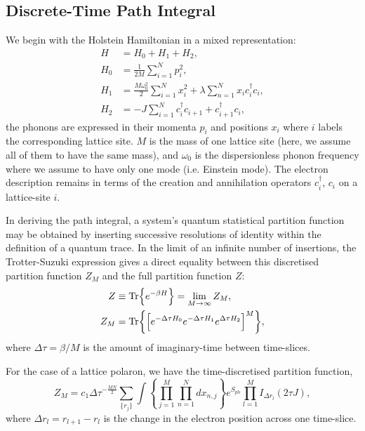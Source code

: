 \subsection{Discrete-Time Path Integral}
\label{subsec:3-2-1}

We begin with the Holstein Hamiltonian in a mixed representation:
\begin{equation}
    \begin{aligned}
        H &= H_{0} + H_{1} + H_{2} , \\
        H_{0} &= \frac{1}{2M} \sum_{i=1}^N p_i^2 , \\
        H_{1} &= \frac{M \omega_0^2}{2} \sum_{i=1}^N x_i^2 + \lambda \sum_{n=1}^N x_i c^\dagger_i c_i , \\
        H_{2} &= -J \sum_{i=1}^N c^\dagger_i c_{i+1} + c_{i+1}^\dagger c_i ,
    \end{aligned}
\end{equation}
the phonons are expressed in their momenta $p_i$ and positions $x_i$ where $i$ labels the corresponding lattice site. $M$ is the mass of one lattice site (here, we assume all of them to have the same mass), and $\omega_0$ is the dispersionless phonon frequency where we assume to have only one mode (i.e. Einstein mode). The electron description remains in terms of the creation and annihilation operators $c^\dagger_i$, $c_i$ on a lattice-site $i$.

In deriving the path integral, a system's quantum statistical partition function may be obtained by inserting successive resolutions of identity within the definition of a quantum trace. In the limit of an infinite number of insertions, the Trotter-Suzuki expression \cite{trotter_product_1959, hatano_finding_2005} gives a direct equality between this discretised partition function $Z_M$ and the full partition function $Z$:
\begin{equation}
    \begin{aligned}
        Z &\equiv \Tr{e^{-\beta H}} = \lim_{M\to\infty} Z_M , \\
        Z_M &= \Tr{\left[ e^{-\Delta\tau H_0} e^{-\Delta\tau H_1} e^{\Delta\tau H_2} \right]^M} ,
    \end{aligned}
\end{equation}
where $\Delta\tau = \beta / M$ is the amount of imaginary-time between time-slices.

For the case of a lattice polaron, we have the time-discretised partition function,
\begin{equation}
    Z_M = c_1 {\Delta\tau}^{-\frac{MN}{2}} \sum_{\{r_j\}} \int \left\{ \prod_{j=1}^M \prod_{n=1}^N dx_{n,j} \right\} e^{S_{ph}} \prod_{l=1}^M I_{\Delta r_l}(2 \tau J) ,
\end{equation}
where $\Delta r_l = r_{l+1} - r_l$ is the change in the electron position across one time-slice.

